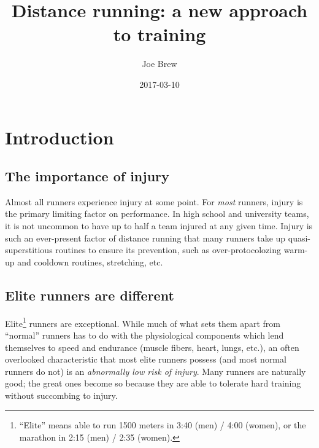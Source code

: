 \documentclass[]{tufte-handout}
\title{Distance running: a new approach to training}
\author{Joe Brew}
\date{2017-03-10}
\newenvironment{Shaded}{}{}
\newcommand{\KeywordTok}[1]{\textcolor[rgb]{0.00,0.44,0.13}{\textbf{{#1}}}}
\newcommand{\DataTypeTok}[1]{\textcolor[rgb]{0.56,0.13,0.00}{{#1}}}
\newcommand{\OtherTok}[1]{\textcolor[rgb]{0.00,0.44,0.13}{{#1}}}
\newcommand{\NormalTok}[1]{{#1}}
\begin{document}
\maketitle




\begin{Shaded}
\end{Shaded}

\section{Introduction}\label{introduction}

\subsection{The importance of injury}\label{the-importance-of-injury}

Almost all runners experience injury at some point. For \emph{most}
runners, injury is the primary limiting factor on performance. In high
school and university teams, it is not uncommon to have up to half a
team injured at any given time. Injury is such an ever-present factor of
distance running that many runners take up quasi-superstitious routines
to ensure its prevention, such as over-protocolozing warm-up and
cooldown routines, stretching, etc.

\subsection{Elite runners are
different}\label{elite-runners-are-different}

Elite\footnote{``Elite'' means able to run 1500 meters in 3:40 (men) /
  4:00 (women), or the marathon in 2:15 (men) / 2:35 (women).} runners
are exceptional. While much of what sets them apart from ``normal''
runners has to do with the physiological components which lend
themselves to speed and endurance (muscle fibers, heart, lungs, etc.),
an often overlooked characteristic that most elite runners possess (and
most normal runners do not) is an \emph{abnormally low risk of injury}.
Many runners are naturally good; the great ones become so because they
are able to tolerate hard training without succombing to injury.
\end{document}
